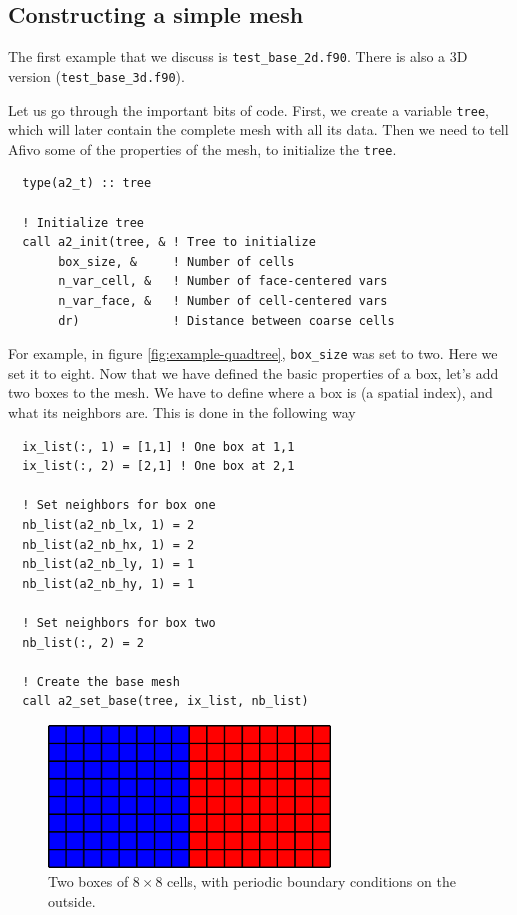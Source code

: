 \documentclass[a4paper, a4wide]{article}
\begin{document}
\subsection{Constructing a simple mesh}
\label{sec:example-base}

The first example that we discuss is \texttt{test\_base\_2d.f90}.
There is also a 3D version (\texttt{test\_base\_3d.f90}).

Let us go through the important bits of code.
First, we create a variable \texttt{tree}, which will later contain the complete
mesh with all its data.
Then we need to tell Afivo some of the properties of the mesh, to initialize the
\texttt{tree}.

\begin{lstlisting}
  type(a2_t) :: tree

  ! Initialize tree
  call a2_init(tree, & ! Tree to initialize
       box_size, &     ! Number of cells
       n_var_cell, &   ! Number of face-centered vars
       n_var_face, &   ! Number of cell-centered vars
       dr)             ! Distance between coarse cells
\end{lstlisting}

For example, in figure \ref{fig:example-quadtree}, \texttt{box\_size} was set to
two. Here we set it to eight.
Now that we have defined the basic properties of a box, let's add two boxes to
the mesh.
We have to define where a box is (a spatial index), and what its neighbors
are.
This is done in the following way
\begin{lstlisting}
  ix_list(:, 1) = [1,1] ! One box at 1,1
  ix_list(:, 2) = [2,1] ! One box at 2,1

  ! Set neighbors for box one
  nb_list(a2_nb_lx, 1) = 2
  nb_list(a2_nb_hx, 1) = 2
  nb_list(a2_nb_ly, 1) = 1
  nb_list(a2_nb_hy, 1) = 1

  ! Set neighbors for box two
  nb_list(:, 2) = 2

  ! Create the base mesh
  call a2_set_base(tree, ix_list, nb_list)
\end{lstlisting}

\begin{figure}
  \centering
  \includegraphics[width=7.5cm]{figures/two_boxes.png}
  \caption{Two boxes of $8 \times 8$ cells, with periodic boundary conditions on
  the outside.}
  \label{fig:two-boxes}
\end{figure}
\end{document}
